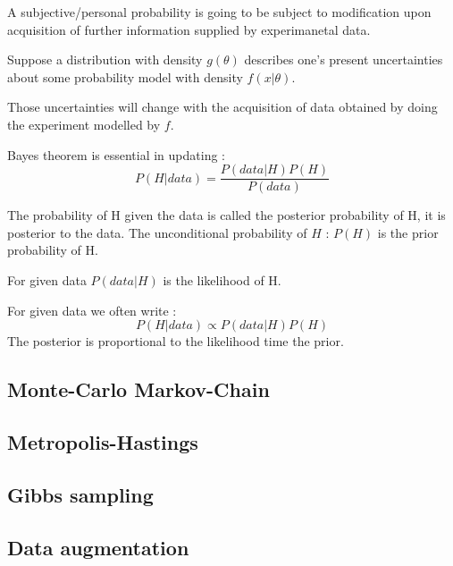 A subjective/personal probability is going to be
subject to modification upon acquisition of
further information supplied
by experimanetal data.

Suppose a distribution with density $g(\theta)$ describes one's
present uncertainties about some probability model 
with density $f(x|\theta)$.

Those uncertainties will change with the acquisition of data 
obtained by doing the experiment modelled by $f$.

Bayes theorem is essential in updating :
$$P(H|data)=\frac{P(data|H)P(H)}{P(data)}$$

The probability of H given the data is called the posterior
probability of H, it is posterior to the data.
The unconditional probability of $H$ : $P(H)$ is the prior
probability of H.

For given data $P(data|H)$ is the likelihood of H.

For given data we often write :
$$P(H|data) \propto P(data|H) P(H)$$
The posterior is proportional to the likelihood time the prior.

\subsection{Monte-Carlo Markov-Chain}

\subsection{Metropolis-Hastings}

\subsection{Gibbs sampling}

\subsection{Data augmentation}

